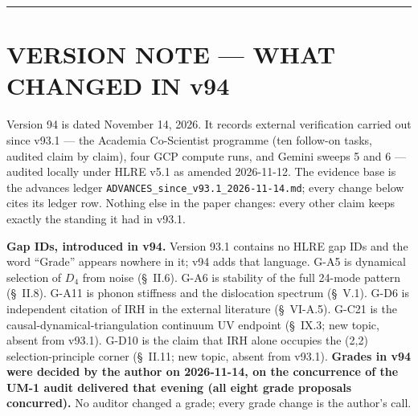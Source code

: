 \documentclass[a4paper,11pt]{article}
\begin{document}
\begin{abstract}
\textbf{What is excluded by theorem.} SO(8) cannot be the gauge algebra, by two independent proofs. The Standard Model algebra does not embed in $\mathfrak{so}(8)$ by any route. The anisotropy coefficient $\xi_2=-1/384$ is not derivable from the stated lattice. Both time-step values stated in v92 violate the framework's own stability bound. Three generations is \textbf{not} a derived result: five candidate mechanisms were tested and all five are closed. Monopole absence, claimed in earlier versions, is withdrawn: it would be inconsistent with $E_6$ realised as a broken gauge group (\S~V.3).

\textbf{What remains open} is stated exhaustively in \S~IX, classified by the type of work each item requires. Every correction made during verification --- including corrections to the author's own prior output --- is recorded in the appendices, and every externally attributable claim carries a linked numerical citation.

The framework claims substantially less than v92 did. What it now claims has been checked --- by hand, by simulation, by independent reproduction, and now by machine. Version 94 (November 14, 2026) adds a front version note recording external-verification results since v93.1; every grade change in it was decided by the author on 2026-11-14, on the concurrence of the UM-1 audit delivered that evening.
\end{abstract}
\vspace{1.2cm}
\hrule
\vspace{1.4cm}
\section*{VERSION NOTE --- WHAT CHANGED IN v94}

Version 94 is dated November 14, 2026. It records external verification carried out since v93.1 --- the Academia Co-Scientist programme (ten follow-on tasks, audited claim by claim), four GCP compute runs, and Gemini sweeps 5 and 6 --- audited locally under HLRE v5.1 as amended 2026-11-12. The evidence base is the advances ledger \texttt{ADVANCES\_since\_v93.1\_2026-11-14.md}; every change below cites its ledger row. Nothing else in the paper changes: every other claim keeps exactly the standing it had in v93.1.

\textbf{Gap IDs, introduced in v94.} Version 93.1 contains no HLRE gap IDs and the word ``Grade'' appears nowhere in it; v94 adds that language. G-A5 is dynamical selection of $D_4$ from noise (\S~II.6). G-A6 is stability of the full 24-mode pattern (\S~II.8). G-A11 is phonon stiffness and the dislocation spectrum (\S~V.1). G-D6 is independent citation of IRH in the external literature (\S~VI-A.5). G-C21 is the causal-dynamical-triangulation continuum UV endpoint (\S~IX.3; new topic, absent from v93.1). G-D10 is the claim that IRH alone occupies the (2,2) selection-principle corner (\S~II.11; new topic, absent from v93.1). \textbf{Grades in v94 were decided by the author on 2026-11-14, on the concurrence of the UM-1 audit delivered that evening (all eight grade proposals concurred).} No auditor changed a grade; every grade change is the author's call.
\end{document}
